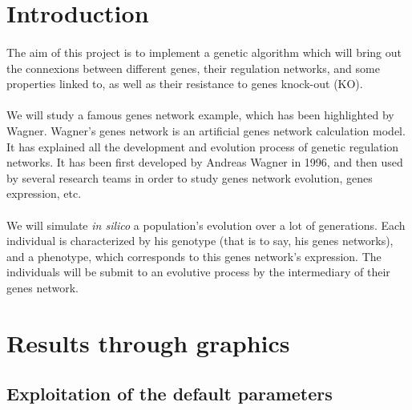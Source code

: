\documentclass[]{report} %
\title{}
\author{}
\date{}
\begin{document}
        \maketitle %




\section*{Introduction}
	\paragraph*{}
	The aim of this project is to implement a genetic algorithm which will bring out the connexions between different genes, their regulation networks, and some properties linked to, as well as their resistance to genes knock-out (KO).
	\paragraph*{}
	We will study a famous genes network example, which has been highlighted by Wagner. Wagner's genes network is an artificial genes network calculation model. It has explained all the development and evolution process of genetic regulation networks. It has been first developed by Andreas Wagner in 1996, and then used by several research teams in order to study genes network evolution, genes expression, etc.
	\paragraph*{}
	We will simulate \textit{in silico} a population's evolution over a lot of generations. Each individual is characterized by his genotype (that is to say, his genes networks), and a phenotype, which corresponds to this genes network's expression. The individuals will be submit to an evolutive process by the intermediary of their genes network.

\section*{Results through graphics}
    \subsection*{Exploitation of the default parameters}
\end{document}
